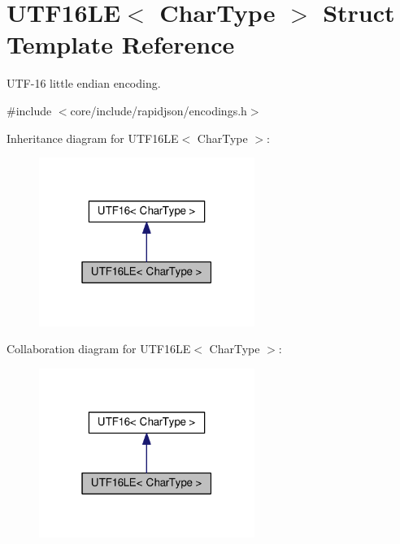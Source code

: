 \hypertarget{structUTF16LE}{}\section{U\+T\+F16\+LE$<$ Char\+Type $>$ Struct Template Reference}
\label{structUTF16LE}


U\+T\+F-\/16 little endian encoding.  




{\ttfamily \#include $<$core/include/rapidjson/encodings.\+h$>$}



Inheritance diagram for U\+T\+F16\+LE$<$ Char\+Type $>$\+:
\nopagebreak
\begin{figure}[H]
\begin{center}
\leavevmode
\includegraphics[width=199pt]{structUTF16LE__inherit__graph}
\end{center}
\end{figure}


Collaboration diagram for U\+T\+F16\+LE$<$ Char\+Type $>$\+:
\nopagebreak
\begin{figure}[H]
\begin{center}
\leavevmode
\includegraphics[width=199pt]{structUTF16LE__coll__graph}
\end{center}
\end{figure}
